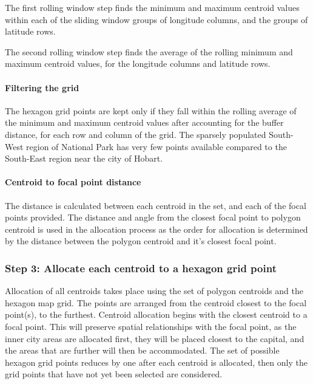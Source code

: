 The first rolling window step finds the minimum and maximum centroid
values within each of the sliding window groups of longitude columns,
and the groups of latitude rows.

The second rolling window step finds the average of the rolling minimum
and maximum centroid values, for the longitude columns and latitude
rows.

\hypertarget{filtering-the-grid}{%
\paragraph{Filtering the grid}\label{filtering-the-grid}}

The hexagon grid points are kept only if they fall within the rolling
average of the minimum and maximum centroid values after accounting for
the buffer distance, for each row and column of the grid. The sparsely
populated South-West region of National Park has very few points
available compared to the South-East region near the city of Hobart.

\hypertarget{centroid-to-focal-point-distance}{%
\paragraph{Centroid to focal point
distance}\label{centroid-to-focal-point-distance}}

The distance is calculated between each centroid in the set, and each of
the focal points provided. The distance and angle from the closest focal
point to polygon centroid is used in the allocation process as the order
for allocation is determined by the distance between the polygon
centroid and it's closest focal point.

\hypertarget{step-3-allocate-each-centroid-to-a-hexagon-grid-point}{%
\subsubsection{Step 3: Allocate each centroid to a hexagon grid
point}\label{step-3-allocate-each-centroid-to-a-hexagon-grid-point}}

Allocation of all centroids takes place using the set of polygon
centroids and the hexagon map grid. The points are arranged from the
centroid closest to the focal point(s), to the furthest. Centroid
allocation begins with the closest centroid to a focal point. This will
preserve spatial relationships with the focal point, as the inner city
areas are allocated first, they will be placed closest to the capital,
and the areas that are further will then be accommodated. The set of
possible hexagon grid points reduces by one after each centroid is
allocated, then only the grid points that have not yet been selected are
considered.

